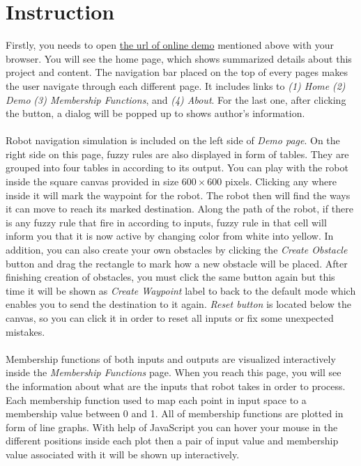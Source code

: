 \documentclass[paper=a4, fontsize=11pt]{scrartcl}
\numberwithin{equation}{section}		%
\numberwithin{figure}{section}			%
\numberwithin{table}{section}				%
\begin{document}
	\section{Instruction}
	Firstly, you needs to open \href{http://tmwatchanan.github.io/fuzzy-robot-navigation}{the url of online demo} mentioned above with your browser. You will see the home page, which shows summarized details about this project and content. The navigation bar placed on the top of every pages makes the user navigate through each different page. It includes links to \textit{(1) Home} \textit{(2) Demo} \textit{(3) Membership Functions}, and \textit{(4) About}. For the last one, after clicking the button, a dialog will be popped up to shows author's information.
	\\\\
	Robot navigation simulation is included on the left side of \textit{Demo page}. On the right side on this page, fuzzy rules are also displayed in form of tables. They are grouped into four tables in according to its output. You can play with the robot inside the square canvas provided in size $600 \times 600$ pixels. Clicking any where inside it will mark the waypoint for the robot. The robot then will find the ways it can move to reach its marked destination. Along the path of the robot, if there is any fuzzy rule that fire in according to inputs, fuzzy rule in that cell will inform you that it is now active by changing color from white into yellow. In addition, you can also create your own obstacles by clicking the \textit{Create Obstacle} button and drag the rectangle to mark how a new obstacle will be placed. After finishing creation of obstacles, you must click the same button again but this time it will be shown as \textit{Create Waypoint} label to back to the default mode which enables you to send the destination to it again. \textit{Reset button} is located below the canvas, so you can click it in order to reset all inputs or fix some unexpected mistakes.
	\\\\
	Membership functions of both inputs and outputs are visualized interactively inside the \textit{Membership Functions} page. When you reach this page, you will see the information about what are the inputs that robot takes in order to process. Each membership function used to map each point in input space to a membership value between 0 and 1. All of membership functions are plotted in form of line graphs. With help of JavaScript you can hover your mouse in the different positions inside each plot then a pair of input value and membership value associated with it will be shown up interactively.
	
\end{document}
